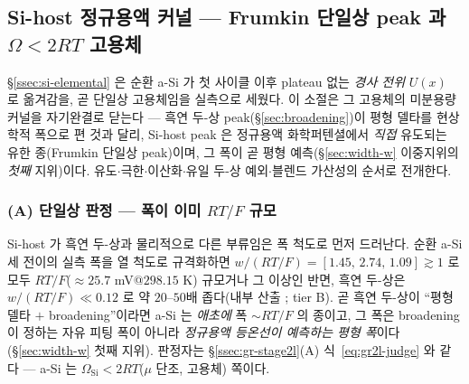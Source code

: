 \subsection{Si-host 정규용액 커널 --- Frumkin 단일상 peak 과 $\Omega<2RT$ 고용체}\label{ssec:si-frumkin}
\S\ref{ssec:si-elemental} 은 순환 a-Si 가 첫 사이클 이후 plateau 없는 \emph{경사 전위} $U(x)$ 로 옮겨감을,
곧 단일상 고용체임을 실측으로 세웠다. 이 소절은 그 고용체의 미분용량 커널을 자기완결로 닫는다 --- 흑연
두-상 peak(\S\ref{sec:broadening})이 평형 델타를 현상학적 폭으로 편 것과 달리, Si-host peak 은 정규용액
화학퍼텐셜에서 \emph{직접} 유도되는 유한 종(Frumkin 단일상 peak)이며, 그 폭이 곧 평형 예측(\S\ref{sec:width-w}
이중지위의 \emph{첫째} 지위)이다. 유도$\cdot$극한$\cdot$이산화$\cdot$유일 두-상 예외$\cdot$블렌드 가산성의
순서로 전개한다.

\subsubsection*{(A) 단일상 판정 --- 폭이 이미 $RT/F$ 규모}
Si-host 가 흑연 두-상과 물리적으로 다른 부류임은 폭 척도로 먼저 드러난다. 순환 a-Si 세 전이의 실측
폭을 열 척도로 규격화하면 $w/(RT/F)=[1.45,\,2.74,\,1.09]\gtrsim1$ 로 모두 $RT/F$($\approx25.7$ mV@$298.15$
K) 규모거나 그 이상인 반면, 흑연 두-상은 $w/(RT/F)\ll0.12$ 로 약 $20$--$50$배 좁다(내부 산출 ;
tier B). 곧 흑연 두-상이 ``평형 델타 $+$ broadening''이라면 a-Si 는 \emph{애초에} 폭 $\sim RT/F$ 의 종이고,
그 폭은 broadening 이 정하는 자유 피팅 폭이 아니라 \emph{정규용액 등온선이 예측하는 평형 폭}이다
(\S\ref{sec:width-w} 첫째 지위). 판정자는 \S\ref{ssec:gr-stage2l}(A) 식~\eqref{eq:gr2l-judge} 와 같다 ---
a-Si 는 $\Omega_\mathrm{Si}<2RT$($\mu$ 단조, 고용체) 쪽이다.

